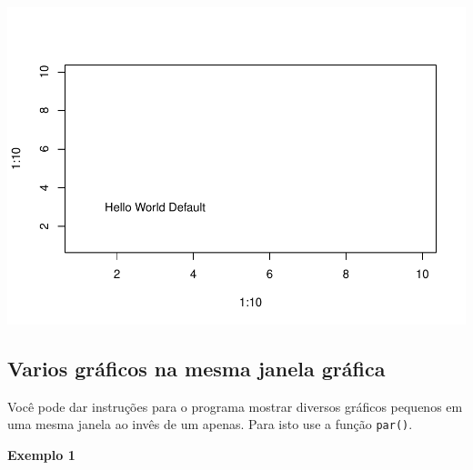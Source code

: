 \documentclass[]{book}
\newenvironment{Shaded}{\begin{snugshade}}{\end{snugshade}}
\newcommand{\CommentTok}[1]{\textcolor[rgb]{0.56,0.35,0.01}{\textit{#1}}}
\newcommand{\DataTypeTok}[1]{\textcolor[rgb]{0.13,0.29,0.53}{#1}}
\newcommand{\DecValTok}[1]{\textcolor[rgb]{0.00,0.00,0.81}{#1}}
\newcommand{\KeywordTok}[1]{\textcolor[rgb]{0.13,0.29,0.53}{\textbf{#1}}}
\newcommand{\NormalTok}[1]{#1}
\newcommand{\OperatorTok}[1]{\textcolor[rgb]{0.81,0.36,0.00}{\textbf{#1}}}
\begin{document}
\includegraphics{TudodoR_files/figure-latex/unnamed-chunk-179-1.pdf}

\hypertarget{varios-graficos-na-mesma-janela-grafica}{%
\subsection{Varios gráficos na mesma janela gráfica}\label{varios-graficos-na-mesma-janela-grafica}}

Você pode dar instruções para o programa mostrar diversos gráficos pequenos em uma mesma janela ao invês de um apenas. Para isto use a função \texttt{par()}.

\textbf{Exemplo 1}

\begin{Shaded}
\end{Shaded}
\end{document}
